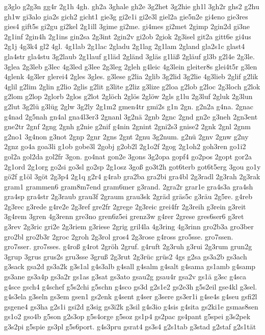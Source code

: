 {g3glo
g2g3n
gg4r
2g1h
4gh.
gh2a
3ghale
gh2e
3g2het
3g2hie
gh1l
3gh2r
ghs2
g2hu
gh1w
gi3alo
gia2s
gich2
gicht1
gie3g
gi2e1i
gi2e3l
giel2a
gie5n2e
gi4eno
gie3res
gies4
gift5s
gi2gu
gi2kel
2g1ill
3gime
gi2me.
gi4mes
gi2met
2gimp
2gin2d
gi3ne
2g1inf
2gin4h
2g1ins
gin2sa
2g3int
2gin2v
gi2ob
2giok
2g3isel
git2a
gitt6e
gi4us
2g1j
4g3k4
gl2
4gl.
4g1lab
2g1lac
2gladu
2g1lag
2g1lam
2gland
gla2s1c
glast4
gla4str
gla4stu
3g2laub
2g1lauf
g1läd
2gländ
3gläs
g1läß
2gläuf
gl3b
g2l4e
2g3le.
3glea
2g3leb
g3lec
4g3led
g3lee
2g3leg
2gleh
g4leic
4g3lein
gleiter8s
glei4t5r
g3len
4glenk
4g3ler
glerei4
2gles
3gles.
g3lese
g2lia
2glib
3g2lid
3g2lie
4g3lieb
2glif
g2lik
4glil
g2lim
2glin
g2lio
2glis
g2lit
g3lite
g2liz
g3lize
g2loa
g2lob
g2loc
2g3loch
g2lok
g2lom
g2lop
2glorb
2glos
g2lot
2glöch
2glös
2glöw
2gls
g1lu
2g3luf
2gluk
2g3lun
g2lut
3g2lü
g3lüg
2glw
3g2ly
2g1m2
gmen4tr
gmi2s
g1n
2gn.
g2n2a
g4na.
2gnac
g4nad
2g5nah
gn4al
gna4l3er3
2gnanl
3g2nä
2gnb
2gnc
2gnd
gn2e
g3neh
2gn3ent
gne2tr
2gnf
2gng
2gnh
g2nie
g2nif
g4nin
2gnint
2gni2s3
gnise2
2gnk
2gnl
2gnm
g2no1
3g4non
g3not
2gnp
2gnr
2gns
2gnt
2gnu
3g2num.
g2nü
2gnv
2gnw
g2ny
2gnz
go4a
goa3li
g1ob
gobe3l
2gobj
g2ob2l
2g1o2f
2gog
2g1oh2
goh3ren
go1i2
gol2a
gol2da
gol2fr
3gon.
go4nat
gon2e
3gons
3g2opa
gopf4
go2pos
2gopt
gor2a
2g1ord
2g1org
go2si
go3sl
go2sp
2g1osz
3goß
go3t2h
got6terb
got6t5erg
3gou
go1y
gö2f
g1öl
3göt
2g3p4
2g1q
g2r4
g4rab
gra2ba
gra2bi
gra4bl
2g3radl
2g3rah
2g3rak
gram1
grammen6
gram8m7end
gram6mer
g3rand.
2gra2r
grar1e
gra4s3a
gra4sh
gra4sp
gra4str
2g3raub
grau3f
2graum
grau3sk
2gräd
gräs5c
g3räu
2g5re.
g4reb
2g3rec
g3rede
g4re2e
2g3ref
gre2fr
2grege
2g3reic
grei4fr
2g3reih
g3rein
g3reit
3g4rem
3gren
4g3renn
gre3no
gren6z5ei
grenz3w
g4rer
2grese
gres6ser6
g3ret
g3rev
2g3ric
gri2e
2g3riem
g3riese
2grig
gril4la
4g3ring
4g3rinn
gro2b3a
gro3ber
gro2bl
gro2b3r
2groc
2groh
2g3rol
gros4
2g3rose
g4ross
gro5sse.
gro7ssen.
gro7sser.
gro7sses.
g4roß
g4rot
2gröh
2gruf.
g4ruft
2g3ruh
g3rui
2g3rum
grun2g
3grup
3grus
grus2s
gru3sse
3gruß
2g3rut
2g3rüc
grüs2
4gs
g2sa
gs3a2b
gs3ach
g3sack
gsa2d
gs3a2k
g3s1al
g4s3alb
g4sall
g4salm
g4salt
g4sama
gs1amb
g4samp
gs3ane
gs3a4p
gs3a2r
gs1as
g3sat
gs3ato
gsau2g
gsau4r
gsa2v
gs1ä
g3sc
g4sca
g4sce
gsch4
g4schef
g5s2chi
g5schn
g4sco
gs3d
g2s1e2
gs2e3h
g5s2eil
gse4kl
g3sel.
g4s3ela
g3seln
gs3em
gsen1
gs2enk
g4sent
g4ser
g3sere
gs3er1i
g4se4s
g4seu
gsfi2l
gsgene4
gs3ha
g2s1i
gsi2d
g3sig
gs3i2k
g3sil
g4s3io
g4sis
g4sita
gs2ki1e
gsmas8sen
gs1o2
gso4b
g5son
g2s3op
g5s4orge
g5soz
gs1p4
gs2pac
gs4pant
g5spei
g3s2pek
g3s2pi
g5spie
gs3pl
g5s6port.
g4s3pru
gsrat4
gs3s4
g2s1tab
g3stad
g2staf
g2s1tät
}
